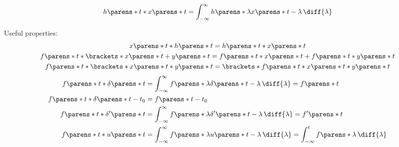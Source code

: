 \begin{multicols}{2}
\begin{CheatsheetEntryFrame}
    \end{CheatsheetEntryFrame}

    \begin{CheatsheetEntryFrame}

        \begin{equation*}
            h\parens*{t} * x\parens*{t}
            = \int_{-\infty}^\infty{
                h\parens*{\lambda} x\parens*{t - \lambda} \,\diff{\lambda}
            }
        \end{equation*}

        Useful properties:
        \begin{gather*}
            x\parens*{t} * h\parens*{t} = h\parens*{t} * x\parens*{t}
            \\
            f\parens*{t} * \brackets*{x\parens*{t} + y\parens*{t}}
            = f\parens*{t} * x\parens*{t} + f\parens*{t} * y\parens*{t}
            \\
            f\parens*{t} * \brackets*{x\parens*{t} * y\parens*{t}}
            = \brackets*{f\parens*{t} * x\parens*{t}} * y\parens*{t}
        \end{gather*}
        \begin{align*}
            f\parens*{t} * \delta\parens*{t}
            &= \int_{-\infty}^\infty {
                f\parens*{\lambda} \delta\parens*{t - \lambda} \,\diff{\lambda}
            }
            = f\parens*{t}
            \\
            f\parens*{t} * \delta\parens*{t - t_0}
            &= f\parens*{t - t_0}
            \\
            f\parens*{t} * \delta'\parens*{t}
            &= \int_{-\infty}^\infty {
                f\parens*{\lambda} \delta'\parens*{t - \lambda} \,\diff{\lambda}
            }
            = f'\parens*{t}
            \\
            f\parens*{t} * u\parens*{t}
            &= \int_{-\infty}^\infty {
                f\parens*{\lambda} u\parens*{t - \lambda} \,\diff{\lambda}
            }
            = \int_{-\infty}^t f\parens*{\lambda} \,\diff{\lambda}
        \end{align*}

    \end{CheatsheetEntryFrame}

    \newcommand{\TmpFTArrow}{{\color{mycontrastblue}\xRightarrow{\FourierTransform}}}

    \begin{CheatsheetEntryFrame}


\end{CheatsheetEntryFrame}
\end{multicols}
